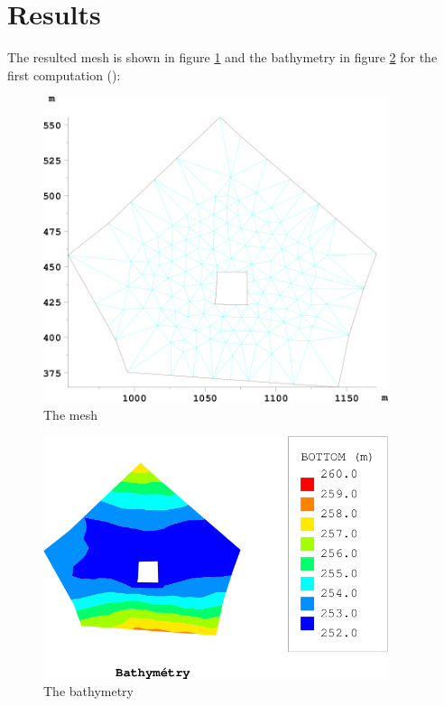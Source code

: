 \section{Results}
The resulted mesh is shown in figure \ref{fig:trigridmaildet:mesh1} and the
bathymetry in figure \ref{fig:trigridmaildet:bathy1} for the first computation
():
\begin{figure}[H]%
\begin{center}
%
  \includegraphics[width=0.9\textwidth]{mesh1}
%
\end{center}
\caption
{The mesh}
\label{fig:trigridmaildet:mesh1}
\end{figure}
%
\begin{figure}[H]%
\begin{center}
%
  \includegraphics[width=0.9\textwidth]{bathy1}
%
\end{center}
\caption
{The bathymetry}
\label{fig:trigridmaildet:bathy1}
\end{figure}
